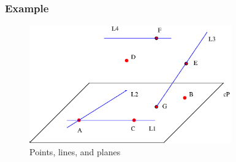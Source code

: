 \begin{frame}
\frametitle{Example}

%
\begin{figure}[h]
  \includegraphics[height=2in]{../../modules/coordinate-systems/pictures/line_plane.eps}
  \caption{Points, lines, and planes}
  \label{fig:points_lines_planes}
\end{figure}
%
\end{frame}